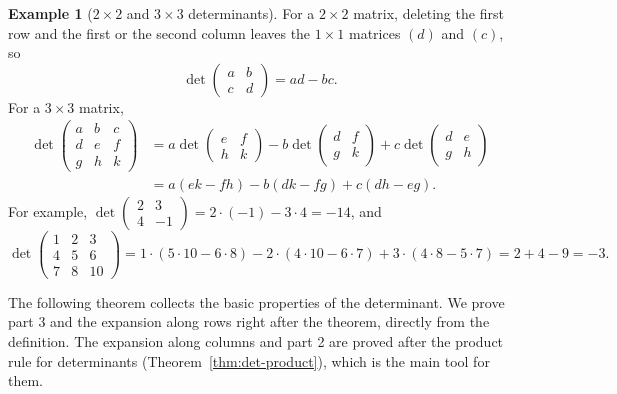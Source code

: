 \documentclass[11pt]{article}
\theoremstyle{definition}
\newtheorem{example}[definition]{Example}
\theoremstyle{plain}
\theoremstyle{remark}
\begin{document}
\begin{example}[$2 \times 2$ and $3 \times 3$ determinants]
    For a $2 \times 2$ matrix, deleting the first row and the first or the second column leaves the $1 \times 1$ matrices $(d)$ and $(c)$, so
    \[\det \begin{pmatrix}
        a & b \\
        c & d
    \end{pmatrix} = ad - bc.\]
    For a $3 \times 3$ matrix,
    \begin{align*}
        \det \begin{pmatrix}
            a & b & c \\
            d & e & f \\
            g & h & k
        \end{pmatrix} &= a \det \begin{pmatrix}
            e & f \\
            h & k
        \end{pmatrix} - b \det \begin{pmatrix}
            d & f \\
            g & k
        \end{pmatrix} + c \det \begin{pmatrix}
            d & e \\
            g & h
        \end{pmatrix} \\
        &= a(ek - fh) - b(dk - fg) + c(dh - eg).
    \end{align*}
    For example, $\det \begin{pmatrix} 2 & 3 \\ 4 & -1 \end{pmatrix} = 2 \cdot (-1) - 3 \cdot 4 = -14$, and
    \[\det \begin{pmatrix}
        1 & 2 & 3 \\
        4 & 5 & 6 \\
        7 & 8 & 10
    \end{pmatrix} = 1 \cdot (5 \cdot 10 - 6 \cdot 8) - 2 \cdot (4 \cdot 10 - 6 \cdot 7) + 3 \cdot (4 \cdot 8 - 5 \cdot 7) = 2 + 4 - 9 = -3.\]
\end{example}

The following theorem collects the basic properties of the determinant. We prove part 3 and the expansion along rows right after the theorem, directly from the definition. The expansion along columns and part 2 are proved after the product rule for determinants (Theorem~\ref{thm:det-product}), which is the main tool for them.
\end{document}
